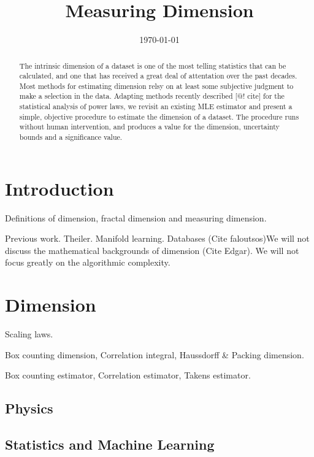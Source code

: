 \documentclass{article}
\title{Measuring Dimension}
\date{\today}
\theoremstyle{definition}
\begin{document}
\maketitle

\begin{abstract}
The intrinsic dimension of a dataset is one of the most telling statistics that can be calculated, and one that has received a great deal of attentation over the past decades. Most methods for estimating dimension relsy on at least some subjective judgment to make a selection in the data. Adapting methods recently described [@! cite] for the statistical analysis of power laws, we revisit an existing MLE estimator and present a simple, objective procedure to estimate the dimension of a dataset. The procedure runs without human intervention, and produces a value for the dimension, uncertainty bounds and a significance value.\end{abstract}

\section{Introduction}

Definitions of dimension, fractal dimension and measuring dimension.

Previous work. Theiler. Manifold learning. Databases (Cite faloutsos)We will not discuss the mathematical backgrounds of dimension (Cite Edgar). We will not focus greatly on the algorithmic complexity.

\section{Dimension}

Scaling laws.

Box counting dimension, Correlation integral, Haussdorff & Packing dimension.

Box counting estimator, Correlation estimator, Takens estimator.

\subsection{Physics}
\subsection{Statistics and Machine Learning}
\subsection{}
\end{document}
